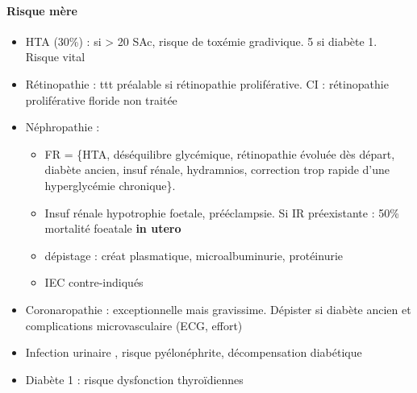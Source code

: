 \documentclass[11pt]{article}
\begin{document}
\paragraph{Risque mère}
\label{sec:org2f22a54}
\begin{itemize}
\item HTA (30\%) : si > 20 SAc, risque de toxémie gradivique. \texttimes{}5 si
diabète 1. Risque vital
\item Rétinopathie : ttt préalable si rétinopathie proliférative. CI : rétinopathie
proliférative floride non traitée
\item Néphropathie : 
\begin{itemize}
\item FR = \{HTA, déséquilibre glycémique, rétinopathie évoluée dès
départ, diabète ancien, insuf rénale, hydramnios, correction trop rapide d'une
hyperglycémie chronique\}.
\item Insuf rénale \thus hypotrophie foetale, prééclampsie. Si IR préexistante : 50\%
mortalité foeatale \textbf{in utero}
\item dépistage : créat plasmatique, microalbuminurie, protéinurie
\item IEC contre-indiqués
\end{itemize}
\item Coronaropathie : exceptionnelle mais gravissime. Dépister si diabète ancien et
complications microvasculaire (ECG, effort)
\item Infection urinaire \inc, risque pyélonéphrite, décompensation diabétique
\item Diabète 1 : \inc risque dysfonction thyroïdiennes
\end{itemize}
\end{document}
